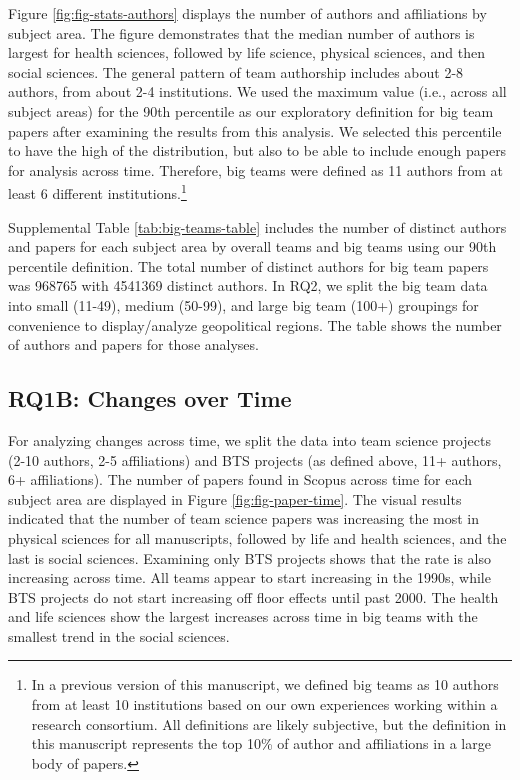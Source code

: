 \documentclass[
  man,floatsintext]{apa7}
\begin{document}
Figure \ref{fig:fig-stats-authors} displays the number of authors and
affiliations by subject area. The figure demonstrates that the median
number of authors is largest for health sciences, followed by life
science, physical sciences, and then social sciences. The general
pattern of team authorship includes about 2-8 authors, from about 2-4
institutions. We used the maximum value (i.e., across all subject areas)
for the 90th percentile as our exploratory definition for big team
papers after examining the results from this analysis. We selected this
percentile to have the high of the distribution, but also to be able to
include enough papers for analysis across time. Therefore, big teams
were defined as 11 authors from at least 6 different institutions.\footnote{In a previous version of this manuscript, we defined big teams as
  10 authors from at least 10 institutions based on our own
  experiences working within a research consortium. All definitions
  are likely subjective, but the definition in this manuscript
  represents the top 10\% of author and affiliations in a large body of
  papers.}

Supplemental Table \ref{tab:big-teams-table} includes the number of
distinct authors and papers for each subject area by overall teams and
big teams using our 90th percentile definition. The total number of
distinct authors for big team papers was 968765 with
4541369 distinct authors. In RQ2, we split the big team
data into small (11-49), medium (50-99), and large big team (100+)
groupings for convenience to display/analyze geopolitical regions. The
table shows the number of authors and papers for those analyses.

\subsection{RQ1B: Changes over Time}\label{rq1b-changes-over-time}

For analyzing changes across time, we split the data into team science
projects (2-10 authors, 2-5 affiliations) and BTS projects (as defined
above, 11+ authors, 6+ affiliations). The number of papers found in
Scopus across time for each subject area are displayed in Figure
\ref{fig:fig-paper-time}. The visual results indicated that the number
of team science papers was increasing the most in physical sciences for
all manuscripts, followed by life and health sciences, and the last is
social sciences. Examining only BTS projects shows that the rate is also
increasing across time. All teams appear to start increasing in the
1990s, while BTS projects do not start increasing off floor effects
until past 2000. The health and life sciences show the largest increases
across time in big teams with the smallest trend in the social sciences.
\end{document}
